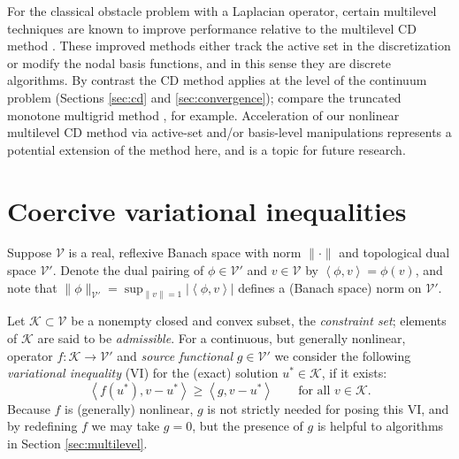 \documentclass[letterpaper,final,12pt,reqno]{amsart}
\theoremstyle{cstyle}
\theoremstyle{cstyle*}
\theoremstyle{dstyle}
\numberwithin{equation}{section}
\numberwithin{figure}{section}
\numberwithin{table}{section}
\numberwithin{theorem}{section}
\newcommand{\cK}{\mathcal{K}}
\newcommand{\cV}{\mathcal{V}}
\newcommand{\ip}[2]{\left<#1,#2\right>}
\begin{document}
For the classical obstacle problem with a Laplacian operator, certain multilevel techniques are known to improve performance relative to the multilevel CD method \cite{GraeserKornhuber2009}.  These improved methods either track the active set in the discretization or modify the nodal basis functions, and in this sense they are discrete algorithms.  By contrast the CD method applies at the level of the continuum problem (Sections \ref{sec:cd} and \ref{sec:convergence}); compare the truncated monotone multigrid method \cite{Kornhuber1994}, for example.  Acceleration of our nonlinear multilevel CD method via active-set and/or basis-level manipulations represents a potential extension of the method here, and is a topic for future research.



\section{Coercive variational inequalities} \label{sec:vi}

Suppose $\cV$ is a real, reflexive Banach space with norm $\|\cdot\|$ and topological dual space $\cV'$.  Denote the dual pairing of $\phi \in \cV'$ and $v\in\cV$ by $\ip{\phi}{v} = \phi(v)$, and note that $\|\phi\|_{\cV'} = \sup_{\|v\|=1} |\ip{\phi}{v}|$ defines a (Banach space) norm on $\cV'$.

Let $\cK \subset \cV$ be a nonempty closed and convex subset, the \emph{constraint set}; elements of $\cK$ are said to be \emph{admissible}.  For a continuous, but generally nonlinear, operator $f:\cK \to \cV'$ and \emph{source functional} $g\in \cV'$ we consider the following \emph{variational inequality} (VI) for the (exact) solution $u^*\in \cK$, if it exists:
\begin{equation}
\ip{f(u^*)}{v-u^*} \ge \ip{g}{v-u^*} \qquad \text{for all } v\in \cK. \label{eq:vi}
\end{equation}
Because $f$ is (generally) nonlinear, $g$ is not strictly needed for posing this VI, and by redefining $f$ we may take $g=0$, but the presence of $g$ is helpful to algorithms in Section \ref{sec:multilevel}.
\end{document}
